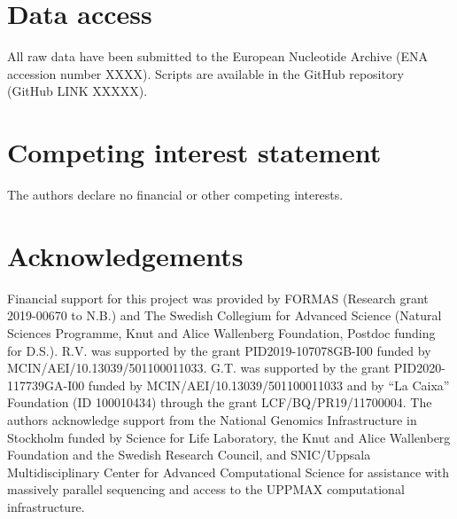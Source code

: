\documentclass[twocolumn]{bmcart}%
\begin{document}


\begin{backmatter}

\section*{Data access}%
All raw data have been submitted to the European Nucleotide Archive (ENA accession number XXXX). Scripts are available in the GitHub repository (GitHub LINK XXXXX).

\section*{Competing interest statement}%
The authors declare no financial or other competing interests.

\section*{Acknowledgements}%
Financial support for this project was provided by FORMAS (Research grant 2019-00670 to N.B.) and The Swedish Collegium for Advanced Science (Natural Sciences Programme, Knut and Alice Wallenberg Foundation, Postdoc funding for D.S.). R.V. was supported by the grant PID2019-107078GB-I00 funded by MCIN/AEI/10.13039/501100011033. G.T. was supported by the grant PID2020-117739GA-I00 funded by MCIN/AEI/10.13039/501100011033 and by “La Caixa” Foundation (ID 100010434) through the grant LCF/BQ/PR19/11700004. The authors acknowledge support from the National Genomics Infrastructure in Stockholm funded by Science for Life Laboratory, the Knut and Alice Wallenberg Foundation and the Swedish Research Council, and SNIC/Uppsala Multidisciplinary Center for Advanced Computational Science for assistance with massively parallel sequencing and access to the UPPMAX computational infrastructure.


\end{backmatter}
\end{document}
